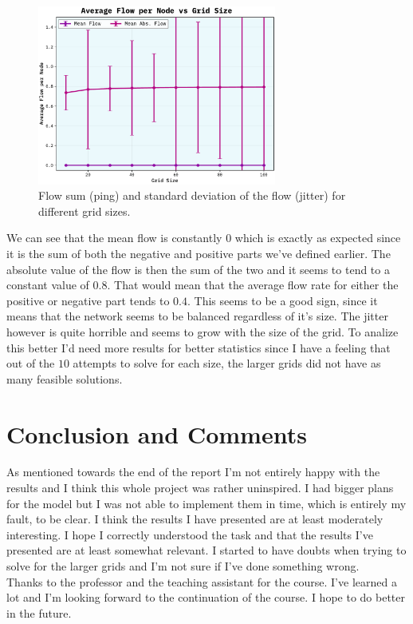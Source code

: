 \documentclass[10pt, titlepage, a4paper]{article}
\begin{document}
\begin{figure}[H]
    \centering
    \includegraphics[width=0.7\textwidth]{../Images/flow-sum.pdf}
    \caption{Flow sum (ping) and standard deviation of the flow (jitter) for different grid sizes.}
    \label{fig:ping-jitter}
\end{figure}

We can see that the mean flow is constantly $0$ which is exactly as expected since it is the sum of both the 
negative and positive parts we've defined earlier. The absolute value of the flow is then the sum of the two and 
it seems to tend to a constant value of $0.8$. That would mean that the average flow rate for either the positive or 
negative part tends to $0.4$. This seems to be a good sign, since it means that the network seems to be balanced regardless of 
it's size. The jitter however is quite horrible and seems to grow with the size of the grid. To analize this better I'd need 
more results for better statistics since I have a feeling that out of the $10$ attempts to solve for each size, the larger grids 
did not have as many feasible solutions. \\

\section{Conclusion and Comments}
As mentioned towards the end of the report I'm not entirely happy with the results and I think this whole project 
was rather uninspired. I had bigger plans for the model but I was not able to implement them in time, which is entirely 
my fault, to be clear. I think the results I have presented are at least moderately interesting. I hope I correctly 
understood the task and that the results I've presented are at least somewhat relevant. I started to have doubts when trying 
to solve for the larger grids and I'm not sure if I've done something wrong. \\

Thanks to the professor and the teaching assistant for the course. I've learned a lot and I'm looking forward to the continuation 
of the course. I hope to do better in the future.

\newpage



\end{document}
